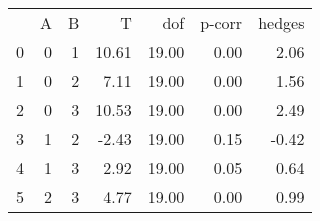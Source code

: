 \begin{tabular}{lrrrrrr}
 & A & B & T & dof & p-corr & hedges \\
0 & 0 & 1 & 10.61 & 19.00 & 0.00 & 2.06 \\
1 & 0 & 2 & 7.11 & 19.00 & 0.00 & 1.56 \\
2 & 0 & 3 & 10.53 & 19.00 & 0.00 & 2.49 \\
3 & 1 & 2 & -2.43 & 19.00 & 0.15 & -0.42 \\
4 & 1 & 3 & 2.92 & 19.00 & 0.05 & 0.64 \\
5 & 2 & 3 & 4.77 & 19.00 & 0.00 & 0.99 \\
\end{tabular}

